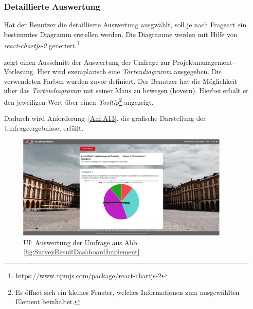 \subsubsection*{Detaillierte Auswertung}
Hat der Benutzer die detaillierte Auswertung ausgwählt, soll je nach Frageart ein bestimmtes Diagramm erstellen werden. 
Die Diagramme werden mit Hilfe von \emph{react-chartjs-2} generiert.\footnote{\url{https://www.npmjs.com/package/react-chartjs-2}} 

\abb {} zeigt einen Ausschnitt der Auswertung der Umfrage zur Projektmanagement-Vorlesung. 
Hier wird exemplarisch eine \emph{Tortendiagramm} ausgegeben. 
Die verwendeten Farben wurden zuvor definiert. 
Der Benutzer hat die Möglichkeit über das \emph{Tortendiagramm} mit seiner Maus zu bewegen (hovern).
Hierbei erhält er den jeweiligen Wert über einen \emph{Tooltip}\footnote{Es öffnet sich ein kleines Fenster, welches Informationen zum ausgewählten Element beinhaltet.} angezeigt.

Dadurch wird Anforderung~\ref{Anf:A13}, die grafische Darstellung der Umfrageergebnisse, erfüllt.

\begin{figure}[!htb]
	\centering
	\includegraphics[width=0.95\textwidth, keepaspectratio]{img/client/SurveyResultDetail2.png}
	\captionsetup{justification=centering, format=plain}
	\caption[\acf{UI}: Auswertung der Umfrage]{\acf{UI}: Auswertung der Umfrage aus Abb. \vref{fig:SurveyResultDashboardImplement} \\ \quelleScreenshot}
	\label{fig:SurveyResultDetailImplement}
\end{figure}
